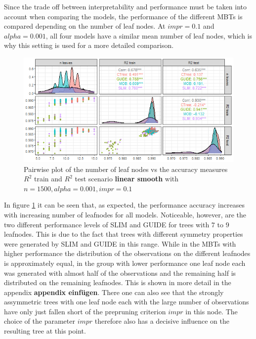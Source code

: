 Since the trade off between interpretability and performance must be taken into account when comparing the models, the performance of the different MBTs is compared depending on the number of leaf nodes. 
At $impr = 0.1$ and $alpha = 0.001$, all four models have a similar mean number of leaf nodes, which is why this setting is used for a more detailed comparison.

\begin{figure}[!htb] 
\centering
    \includegraphics[width=16cm]{Figures/simulations/batchtools/basic_scenarios/linear_smooth/ls_1000_standalone_r2_nleaves.png}
    \caption{Pairwise plot of the number of leaf nodes vs the accuracy measures $R^2$ train and $R^2$ test scenario \textbf{linear smooth} with $n=1500, alpha = 0.001, impr = 0.1$}
    \label{fig:ls_1000_standalone_r2_nleaves}
\end{figure} 


In figure \ref{fig:ls_1000_standalone_r2_nleaves} it can be seen that, as expected, the performance accuracy increases with increasing number of leafnodes for all models. Noticeable, however, are the two different performance levels of SLIM and GUIDE for trees with $7$ to $9$ leafnodes. This is due to the fact that trees with different symmetry properties were generated by SLIM and GUIDE in this range. While in the MBTs with higher performance the distribution of the observations on the different leafnodes is approximately equal, in the group with lower performance one leaf node each was generated with almost half of the observations and the remaining half is distributed on the remaining leafnodes. This is shown in more detail in the appendix \textbf{appendix einfügen}. There one can also see that the strongly assymmetric trees with one leaf node each with the large number of observations have only just fallen short of the prepruning criterion $impr$ in this node. The choice of the parameter $impr$ therefore also has a decisive influence on the resulting tree at this point.





